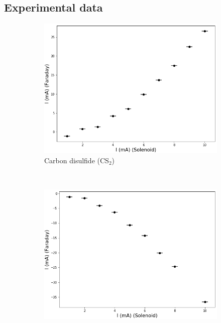 \documentclass[11pt,a4paper]{article}
\begin{document}
\vfill
{\color{white}\cite{wilson1997simple}\cite{note19923}\cite{montarou2004two}\cite{freiser1968survey}}



\newpage
\begin{appendices}
\section{Experimental data}\label{app:experimental_data}

\begin{figure}[H]
\centering
\begin{subfigure}[b]{0.55\textwidth}
\includegraphics[width=\textwidth]{sample3}
\caption{Carbon disulfide (CS$_2$)}
\label{fig:CME_sample3}
\end{subfigure}\\\vspace{.2cm}
\begin{subfigure}[b]{0.55\textwidth}
\includegraphics[width=\textwidth]{sample2}

\end{subfigure}
\end{figure}
\end{appendices}
\end{document}
